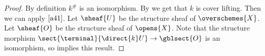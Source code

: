 \begin{proof}
By definition $k^{\#}$ is an isomorphism.
By  we get that $k$ is cover lifting.
Then we can apply $\Cref{a41}$.
Let $\sheaf{U}$ be the structure sheaf of $\overschemes{X}$.
Let $\sheaf{O}$ be the structure sheaf of $\opens{X}$.
Note that the structure morphism $\sect{\terminal}{\direct{k}U} \rightarrow \gblsect{O}$
is an isomorphism, so  implies this result.
\end{proof}